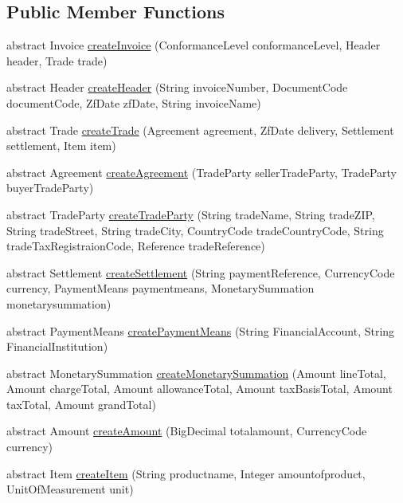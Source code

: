 \subsection*{Public Member Functions}
\begin{DoxyCompactItemize}
\item 
abstract Invoice \hyperlink{class_invoice_1_1_a_invoice_facade_a1a341881dd752fd6f39c90eb3fb5fb3b}{create\+Invoice} (Conformance\+Level conformance\+Level, Header header, Trade trade)
\item 
abstract Header \hyperlink{class_invoice_1_1_a_invoice_facade_a868f328c036963f62ee01f814300e2b3}{create\+Header} (String invoice\+Number, Document\+Code document\+Code, Zf\+Date zf\+Date, String invoice\+Name)
\item 
abstract Trade \hyperlink{class_invoice_1_1_a_invoice_facade_a0d997edce566e18636caa977ff53e8c5}{create\+Trade} (Agreement agreement, Zf\+Date delivery, Settlement settlement, Item item)
\item 
abstract Agreement \hyperlink{class_invoice_1_1_a_invoice_facade_a35b53b5391402584705fca7487597363}{create\+Agreement} (Trade\+Party seller\+Trade\+Party, Trade\+Party buyer\+Trade\+Party)
\item 
abstract Trade\+Party \hyperlink{class_invoice_1_1_a_invoice_facade_a2efea0f097b1b2017763b3d7b058ff57}{create\+Trade\+Party} (String trade\+Name, String trade\+Z\+IP, String trade\+Street, String trade\+City, Country\+Code trade\+Country\+Code, String trade\+Tax\+Registraion\+Code, Reference trade\+Reference)
\item 
abstract Settlement \hyperlink{class_invoice_1_1_a_invoice_facade_a9969efabe798502c0633e98b4f00ec91}{create\+Settlement} (String payment\+Reference, Currency\+Code currency, Payment\+Means paymentmeans, Monetary\+Summation monetarysummation)
\item 
abstract Payment\+Means \hyperlink{class_invoice_1_1_a_invoice_facade_a8c85172421b8d21567011deb456769c3}{create\+Payment\+Means} (String Financial\+Account, String Financial\+Institution)
\item 
abstract Monetary\+Summation \hyperlink{class_invoice_1_1_a_invoice_facade_acbaeec266fd4b8d7ca365e6f9851acdd}{create\+Monetary\+Summation} (Amount line\+Total, Amount charge\+Total, Amount allowance\+Total, Amount tax\+Basis\+Total, Amount tax\+Total, Amount grand\+Total)
\item 
abstract Amount \hyperlink{class_invoice_1_1_a_invoice_facade_a134c738ea52f250f1207aa844b4343ac}{create\+Amount} (Big\+Decimal totalamount, Currency\+Code currency)
\item 
abstract Item \hyperlink{class_invoice_1_1_a_invoice_facade_a23564e7efc713fe9d329d9ac879706b0}{create\+Item} (String productname, Integer amountofproduct, Unit\+Of\+Measurement unit)
\end{DoxyCompactItemize}


